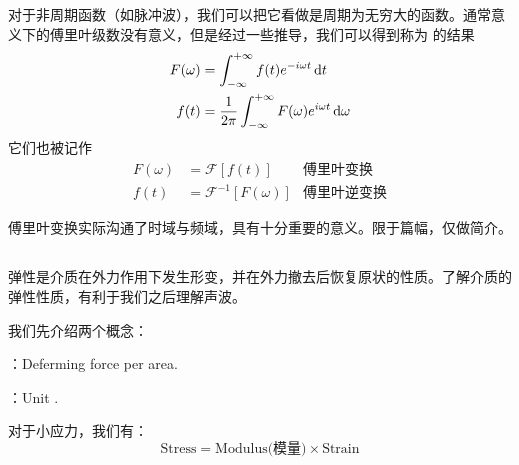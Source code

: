 对于非周期函数（如脉冲波），我们可以把它看做是周期为无穷大的函数。通常意义下的傅里叶级数没有意义，但是经过一些推导，我们可以得到称为  的结果
\[
    \begin{aligned}
        F(\omega) & =\int^{+\infty}_{-\infty}f(t)e^{-i\omega t}\dif t                        \\
        f(t)      & =\frac{1}{2\pi}\int^{+\infty}_{-\infty}F(\omega)e^{i\omega t}\dif \omega
    \end{aligned}
\]
它们也被记作\[
    \begin{aligned}
        F(\omega) & =\mathcal{F}[f(t)]           & \text{傅里叶变换}  \\
        f(t)      & =\mathcal{F}^{-1}[F(\omega)] & \text{傅里叶逆变换}
    \end{aligned}
\]

傅里叶变换实际沟通了时域与频域，具有十分重要的意义。限于篇幅，仅做简介。


\subsection[弹性]{}
弹性是介质在外力作用下发生形变，并在外力撤去后恢复原状的性质。了解介质的弹性性质，有利于我们之后理解声波。

我们先介绍两个概念：

\begin{Itemize}
    \item {}：Deferming force per area.
    \item {}：Unit .
\end{Itemize}

对于小应力，我们有：
\[
    \text{Stress}=\text{Modulus(模量)}\times\text{Strain}
\]


